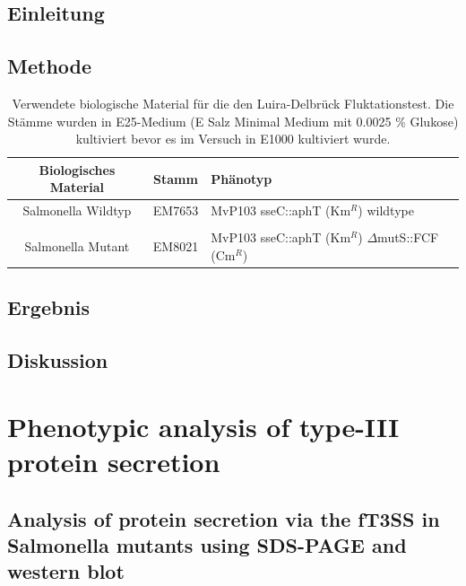 \documentclass[oneside,10pt,a4paper]{report}
\begin{document}
		\section{Einleitung}
		\section{Methode}
			\begin{table}[H]
			\centering
			\caption{Verwendete biologische Material für die den Luira-Delbrück Fluktationstest. Die Stämme wurden in E25-Medium (E Salz Minimal Medium mit 0.0025 $\%$ Glukose) kultiviert bevor es im Versuch in E1000 kultiviert wurde.}
			\label{tab: exp4-biologisches Material}
			\begin{tabular}{ccp{7.5cm}}
				\toprule
				Biologisches Material& Stamm & Phänotyp\\
				\midrule
				\multirow{2}{*}{\parbox[t]{2cm}{Salmonella Wildtyp}}  & \multirow{2}{*}{EM7653} & \multirow{2}{*}{MvP103 sseC::aphT (Km$^R$) wildtype}\\
				&&\\
				&&\\
				\multirow{3}{*}{\parbox[t]{2cm}{Salmonella Mutant}} & \multirow{3}{*}{EM8021} &\multirow{3}{*}{MvP103 sseC::aphT (Km$^R$) $\Delta$mutS::FCF (Cm$^R$)} \\
				&&\\
				&&\\
				
				\bottomrule			
			\end{tabular}
		\end{table}
		
		
		\section{Ergebnis}
		
		\section{Diskussion}
	
	\chapter{Phenotypic analysis of type-III protein secretion}
	
		\section{Analysis of protein secretion via the fT3SS in Salmonella mutants using SDS-PAGE and western blot}
	
\end{document}
